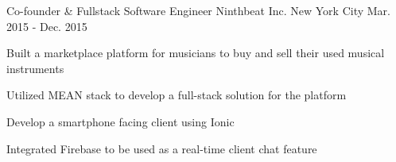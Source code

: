 \begin{cventries}
  \cventry
    {Co-founder \& Fullstack Software Engineer} %
    {Ninthbeat Inc.} %
    {New York City} %
    {Mar. 2015 - Dec. 2015} %
    {
      \begin{cvitems} %
        \item {Built a marketplace platform for musicians to buy and sell their used musical instruments}
        \item {Utilized MEAN stack to develop a full-stack solution for the platform}
        \item {Develop a smartphone facing client using Ionic}
        \item {Integrated Firebase to be used as a real-time client chat feature}
      \end{cvitems}
    }

\end{cventries}
